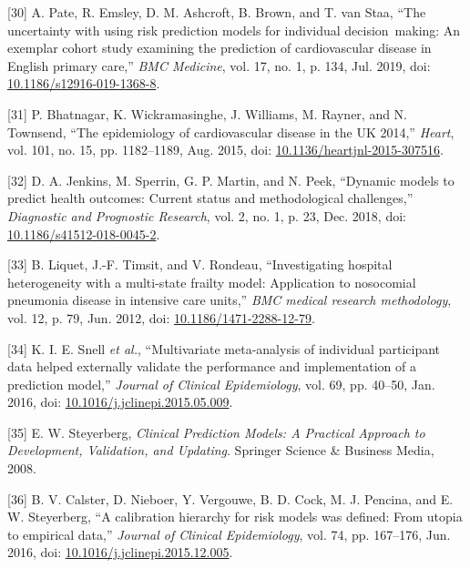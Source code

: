 \documentclass[12pt,PhD,twoside,openright]{muthesis}
\newenvironment{cslreferences}%
  {}%
  {\par}
\begin{document}
\begin{cslreferences}
\leavevmode\hypertarget{ref-pate_uncertainty_2019}{}%
{[}30{]} A. Pate, R. Emsley, D. M. Ashcroft, B. Brown, and T. van Staa, ``The uncertainty with using risk prediction models for individual decision~making: An exemplar cohort study examining the prediction of cardiovascular disease in English primary care,'' \emph{BMC Medicine}, vol. 17, no. 1, p. 134, Jul. 2019, doi: \href{https://doi.org/10.1186/s12916-019-1368-8}{10.1186/s12916-019-1368-8}.

\leavevmode\hypertarget{ref-bhatnagar_epidemiology_2015}{}%
{[}31{]} P. Bhatnagar, K. Wickramasinghe, J. Williams, M. Rayner, and N. Townsend, ``The epidemiology of cardiovascular disease in the UK 2014,'' \emph{Heart}, vol. 101, no. 15, pp. 1182--1189, Aug. 2015, doi: \href{https://doi.org/10.1136/heartjnl-2015-307516}{10.1136/heartjnl-2015-307516}.

\leavevmode\hypertarget{ref-jenkins_dynamic_2018}{}%
{[}32{]} D. A. Jenkins, M. Sperrin, G. P. Martin, and N. Peek, ``Dynamic models to predict health outcomes: Current status and methodological challenges,'' \emph{Diagnostic and Prognostic Research}, vol. 2, no. 1, p. 23, Dec. 2018, doi: \href{https://doi.org/10.1186/s41512-018-0045-2}{10.1186/s41512-018-0045-2}.

\leavevmode\hypertarget{ref-liquet_investigating_2012}{}%
{[}33{]} B. Liquet, J.-F. Timsit, and V. Rondeau, ``Investigating hospital heterogeneity with a multi-state frailty model: Application to nosocomial pneumonia disease in intensive care units,'' \emph{BMC medical research methodology}, vol. 12, p. 79, Jun. 2012, doi: \href{https://doi.org/10.1186/1471-2288-12-79}{10.1186/1471-2288-12-79}.

\leavevmode\hypertarget{ref-snell_multivariate_2016}{}%
{[}34{]} K. I. E. Snell \emph{et al.}, ``Multivariate meta-analysis of individual participant data helped externally validate the performance and implementation of a prediction model,'' \emph{Journal of Clinical Epidemiology}, vol. 69, pp. 40--50, Jan. 2016, doi: \href{https://doi.org/10.1016/j.jclinepi.2015.05.009}{10.1016/j.jclinepi.2015.05.009}.

\leavevmode\hypertarget{ref-steyerberg_clinical_2008}{}%
{[}35{]} E. W. Steyerberg, \emph{Clinical Prediction Models: A Practical Approach to Development, Validation, and Updating}. Springer Science \& Business Media, 2008.

\leavevmode\hypertarget{ref-calster_calibration_2016-1}{}%
{[}36{]} B. V. Calster, D. Nieboer, Y. Vergouwe, B. D. Cock, M. J. Pencina, and E. W. Steyerberg, ``A calibration hierarchy for risk models was defined: From utopia to empirical data,'' \emph{Journal of Clinical Epidemiology}, vol. 74, pp. 167--176, Jun. 2016, doi: \href{https://doi.org/10.1016/j.jclinepi.2015.12.005}{10.1016/j.jclinepi.2015.12.005}.


\end{cslreferences}
\end{document}
